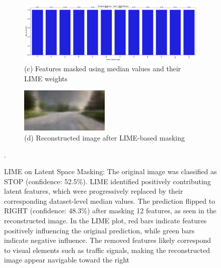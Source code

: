 \begin{figure}[htbp]
\begin{subfigure}{0.72\textwidth}
    \end{subfigure}
    \vspace{0.5em}
    \begin{subfigure}{0.72\textwidth}
        \includegraphics[width=\linewidth]{img/masking/lime_on_latent/town7_002748.png_masked_features.png}
        \caption*{(c) Features masked using median values and their LIME weights}
    \end{subfigure}
    \hfill
    \begin{subfigure}{0.24\textwidth}
        \includegraphics[width=\linewidth]{img/masking/lime_on_latent/reconstructed_lime_on_features.png}
        \caption*{(d) Reconstructed image after LIME-based masking}
    \end{subfigure}

    \caption{LIME on Latent Space Masking: The original image was classified as STOP (confidence: 52.5\%). LIME identified positively contributing latent features, which were progressively replaced by their corresponding dataset-level median values. The prediction flipped to RIGHT (confidence: 48.3\%) after masking 12 features, as seen in the reconstructed image. In the LIME plot, red bars indicate features positively influencing the original prediction, while green bars indicate negative influence. The removed features likely correspond to visual elements such as traffic signals, making the reconstructed image appear navigable toward the right}.
    \label{fig:lime_latent_example}
\end{figure}

